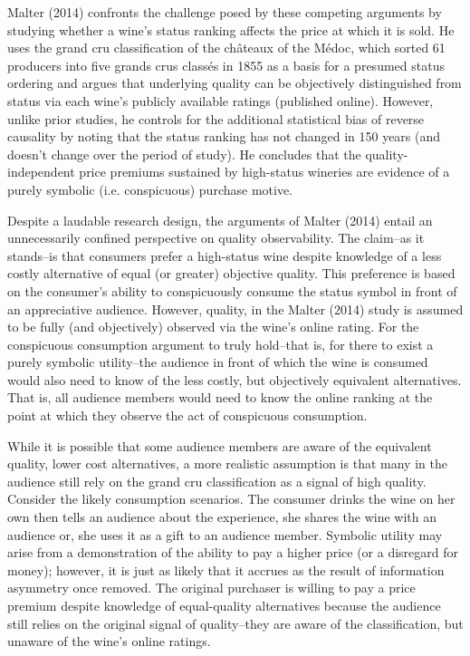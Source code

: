 Malter (2014) confronts the challenge posed by these competing arguments by studying whether a wine's status ranking affects the price at which it is sold. He uses the grand cru classification of the ch\^ateaux of the M\'edoc, which sorted 61 producers into five grands crus class\'es in 1855 as a basis for a presumed status ordering and argues that underlying quality can be objectively distinguished from status via each wine's publicly available ratings (published online). However, unlike prior studies, he controls for the additional statistical bias of reverse causality by noting that the status ranking has not changed in 150 years (and doesn't change over the period of study). He concludes that the quality-independent price premiums sustained by high-status wineries are evidence of a purely symbolic (i.e. conspicuous) purchase motive.

Despite a laudable research design, the arguments of Malter (2014) entail an unnecessarily confined perspective on quality observability. The claim--as it stands--is that consumers prefer a high-status wine despite knowledge of a less costly alternative of equal (or greater) objective quality. This preference is based on the consumer's ability to conspicuously consume the status symbol in front of an appreciative audience. However, quality, in the Malter (2014) study is assumed to be fully (and objectively) observed via the wine's online rating. For the conspicuous consumption argument to truly hold--that is, for there to exist a purely symbolic utility--the audience in front of which the wine is consumed would also need to know of the less costly, but objectively equivalent alternatives. That is, all audience members would need to know the online ranking at the point at which they observe the act of conspicuous consumption.

While it is possible that some audience members are aware of the equivalent quality, lower cost alternatives, a more realistic assumption is that many in the audience still rely on the grand cru classification as a signal of high quality. Consider the likely consumption scenarios. The consumer drinks the wine on her own then tells an audience about the experience, she shares the wine with an audience or, she uses it as a gift to an audience member. Symbolic utility may arise from a demonstration of the ability to pay a higher price (or a disregard for money); however, it is just as likely that it accrues as the result of information asymmetry once removed. The original purchaser is willing to pay a price premium despite knowledge of equal-quality alternatives because the audience still relies on the original signal of quality--they are aware of the classification, but unaware of the wine's online ratings. 

